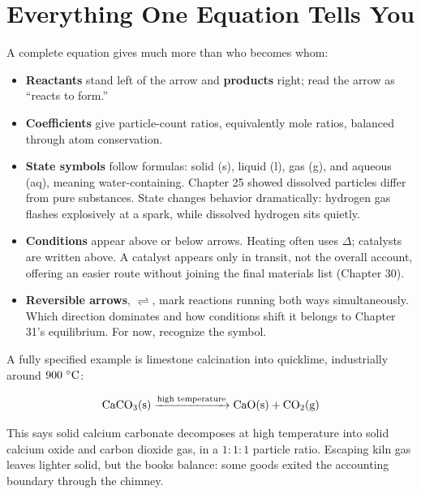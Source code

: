 \section{Everything One Equation Tells You}

A complete equation gives much more than who becomes whom:

\begin{itemize}[itemsep=2pt]
\item \textbf{Reactants} stand left of the arrow and \textbf{products} right; read the arrow as ``reacts to form.''
\item \textbf{Coefficients} give particle-count ratios, equivalently mole ratios, balanced through atom conservation.
\item \textbf{State symbols} follow formulas: solid (s), liquid (l), gas (g), and aqueous (aq), meaning water-containing. Chapter 25 showed dissolved particles differ from pure substances. State changes behavior dramatically: hydrogen gas flashes explosively at a spark, while dissolved hydrogen sits quietly.
\item \textbf{Conditions} appear above or below arrows. Heating often uses $\Delta$; catalysts are written above. A catalyst appears only in transit, not the overall account, offering an easier route without joining the final materials list (Chapter 30).
\item \textbf{Reversible arrows}, $\rightleftharpoons$, mark reactions running both ways simultaneously. Which direction dominates and how conditions shift it belongs to Chapter 31's equilibrium. For now, recognize the symbol.
\end{itemize}

A fully specified example is limestone calcination into quicklime, industrially around $900\ \mathrm{^{\circ}C}$:

\[\mathrm{CaCO_3(s)} \xrightarrow{\text{high temperature}} \mathrm{CaO(s)} + \mathrm{CO_2(g)}\]

This says solid calcium carbonate decomposes at high temperature into solid calcium oxide and carbon dioxide gas, in a $1:1:1$ particle ratio. Escaping kiln gas leaves lighter solid, but the books balance: some goods exited the accounting boundary through the chimney.

